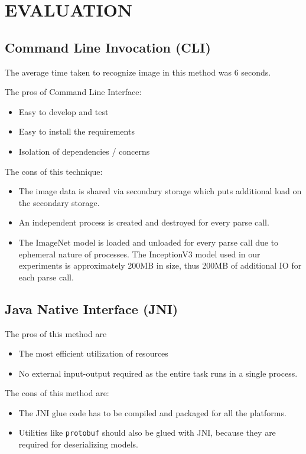 \section {EVALUATION} \label{sec:evaluation}
\subsection{Command Line Invocation (CLI)} \label{sec:eval-cli}
The average time taken to recognize image in this method was 6 seconds.

The pros of Command Line Interface:
\begin{itemize}
\item Easy to develop and test
\item Easy to install the requirements
\item Isolation of dependencies / concerns
\end{itemize}

The cons of this technique:
\begin{itemize}
\item The image data is shared via secondary storage which puts additional load on the  secondary storage.
\item An independent process is created and destroyed for every parse call.
\item The ImageNet model is loaded and unloaded for every parse call due to ephemeral nature of processes. The InceptionV3 model used in our experiments is approximately 200MB in size, thus 200MB of additional IO for each parse call.
\end{itemize}

\subsection{Java Native Interface (JNI)} \label{sec:eval-jni}

The pros of this method are
\begin{itemize}
\item The most efficient utilization of resources
\item No external input-output required as the entire task runs in a single process.
\end{itemize}

The cons of this method are:
\begin{itemize}
  \item The JNI glue code has to be compiled and packaged for all the platforms.
  \item Utilities like \texttt{protobuf} should also be glued with JNI, because they are required for deserializing models\cite{javacpp-240}.
\end{itemize}

